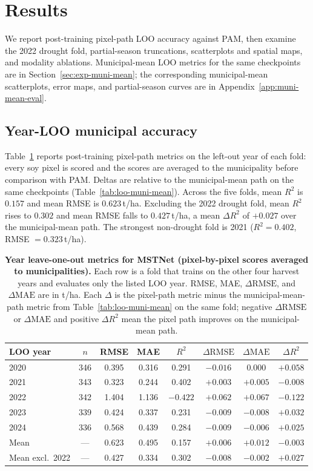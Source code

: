 \section{Results}
\label{sec:results}

We report post-training pixel-path LOO accuracy against PAM, then examine the 2022 drought fold, partial-season truncations, scatterplots and spatial maps, and modality ablations.
Municipal-mean LOO metrics for the same checkpoints are in Section~\ref{sec:exp-muni-mean}; the corresponding municipal-mean scatterplots, error maps, and partial-season curves are in Appendix~\ref{app:muni-mean-eval}.

\subsection{Year-LOO municipal accuracy}
Table~\ref{tab:loo-metrics} reports post-training pixel-path metrics on the left-out year of each fold: every soy pixel is scored and the scores are averaged to the municipality before comparison with PAM.
Deltas are relative to the municipal-mean path on the same checkpoints (Table~\ref{tab:loo-muni-mean}).
Across the five folds, mean $R^2$ is $0.157$ and mean RMSE is $0.623$\,\si{t/ha}.
Excluding the 2022 drought fold, mean $R^2$ rises to $0.302$ and mean RMSE falls to $0.427$\,\si{t/ha}, a mean $\Delta R^2$ of $+0.027$ over the municipal-mean path.
The strongest non-drought fold is 2021 ($R^2=0.402$, RMSE $=0.323$\,\si{t/ha}).

\begin{table}[!htbp]
\centering
\caption{\textbf{Year leave-one-out metrics for MSTNet (pixel-by-pixel scores averaged to municipalities).}
Each row is a fold that trains on the other four harvest years and evaluates only the listed LOO year.
RMSE, MAE, $\Delta\mathrm{RMSE}$, and $\Delta\mathrm{MAE}$ are in \si{t/ha}.
Each $\Delta$ is the pixel-path metric minus the municipal-mean-path metric from Table~\ref{tab:loo-muni-mean} on the same fold; negative $\Delta\mathrm{RMSE}$ or $\Delta\mathrm{MAE}$ and positive $\Delta R^2$ mean the pixel path improves on the municipal-mean path.}
\label{tab:loo-metrics}
\begin{tabular}{lccccccc}
\toprule
LOO year & $n$ & RMSE & MAE & $R^2$ & $\Delta\mathrm{RMSE}$ & $\Delta\mathrm{MAE}$ & $\Delta R^2$ \\
\midrule
2020 & 346 & 0.395 & 0.316 & 0.291 & $-0.016$ & $0.000$ & $+0.058$ \\
2021 & 343 & 0.323 & 0.244 & 0.402 & $+0.003$ & $+0.005$ & $-0.008$ \\
2022 & 342 & 1.404 & 1.136 & $-0.422$ & $+0.062$ & $+0.067$ & $-0.122$ \\
2023 & 339 & 0.424 & 0.337 & 0.231 & $-0.009$ & $-0.008$ & $+0.032$ \\
2024 & 336 & 0.568 & 0.439 & 0.284 & $-0.009$ & $-0.006$ & $+0.025$ \\
\midrule
Mean & --- & 0.623 & 0.495 & 0.157 & $+0.006$ & $+0.012$ & $-0.003$ \\
Mean excl.\ 2022 & --- & 0.427 & 0.334 & 0.302 & $-0.008$ & $-0.002$ & $+0.027$ \\
\bottomrule
\end{tabular}
\end{table}


